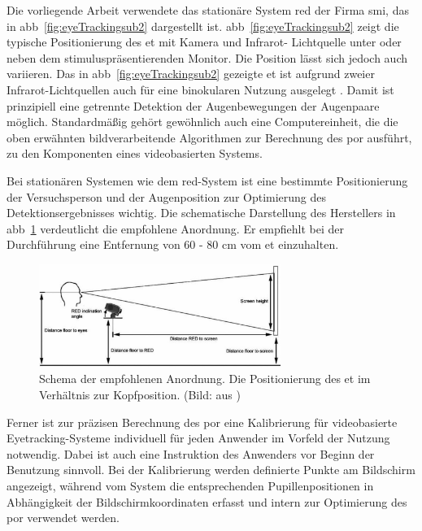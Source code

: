 Die vorliegende Arbeit verwendete das stationäre System \acf{red} der Firma \acf{smi}, das in \acs{abb}~\ref{fig:eyeTrackingsub2} dargestellt ist. \acl{abb}~\ref{fig:eyeTrackingsub2} zeigt die typische Positionierung des \acs{et} mit Kamera und Infrarot- Lichtquelle unter oder neben dem stimuluspräsentierenden Monitor. Die Position lässt sich jedoch auch variieren.  Das in \acs{abb}~\ref{fig:eyeTrackingsub2} gezeigte \acs{et} ist aufgrund zweier Infrarot-Lichtquellen auch für eine binokularen Nutzung ausgelegt \cite{Eidam2015,SMI2011}. Damit ist prinzipiell eine getrennte Detektion der Augenbewegungen der Augenpaare möglich. Standardmäßig gehört gewöhnlich auch eine Computereinheit, die die oben erwähnten bildverarbeitende Algorithmen zur Berechnung des \acs{por} ausführt, zu den Komponenten eines videobasierten Systems. 

Bei stationären Systemen wie dem \acs{red}-System ist eine bestimmte Positionierung der Versuchsperson und der Augenposition zur Optimierung des Detektionsergebnisses wichtig. Die schematische Darstellung des Herstellers in \acs{abb}~\ref{fig:empfehlung} verdeutlicht die empfohlene Anordnung. Er empfiehlt bei der Durchführung eine Entfernung von 60 - 80 cm vom \acs{et} einzuhalten.

\begin{figure}[ht]
\begin{center}
\includegraphics[width=0.7\textwidth]{bilder/grundlagen/Schema.JPG}
\end{center}
\caption{Schema der empfohlenen Anordnung.
Die Positionierung des \acs{et} im Verhältnis zur Kopfposition. (Bild: aus \cite[S.150]{SMI2011})}
\label{fig:empfehlung}
\end{figure}

Ferner ist zur präzisen Berechnung des \acs{por} eine Kalibrierung für videobasierte Eyetracking-Systeme individuell für jeden Anwender im Vorfeld der Nutzung notwendig. Dabei ist auch eine Instruktion des Anwenders vor Beginn der Benutzung sinnvoll. Bei der Kalibrierung werden definierte Punkte am Bildschirm angezeigt, während vom System die entsprechenden Pupillenpositionen in Abhängigkeit der Bildschirmkoordinaten erfasst und intern zur Optimierung des \acs{por} verwendet werden.  

